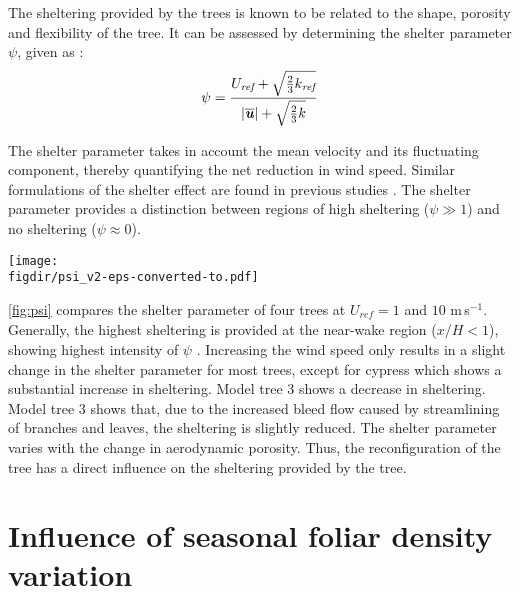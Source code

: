 The sheltering provided by the trees is known to be related to the shape, porosity and flexibility of the tree. It can be assessed by determining the shelter parameter $\psi$, given as \citep{Gandemer1979}:
\begin{equation}
\psi  = \frac{{{U_{\textit{ref}}} + \sqrt {\frac{2}{3} {k_{\textit{ref}}}} }}{{ |\overline{\textbf{\textit{u}}}| + \sqrt {\frac{2}{3} k} }}
\end{equation}

The shelter parameter takes in account the mean velocity and its fluctuating component, thereby quantifying the net reduction in wind speed. Similar formulations of the shelter effect are found in previous studies \citep{Lee2014565,Lee2012,McClure2017,Packwood2000,Perera1981,Santiago2007}. The shelter parameter provides a distinction between regions of high sheltering ($\psi \gg 1$) and no sheltering ($\psi \approx 0$).

	\begin{sidewaysfigure}[p]
	\centering
	\texttt{[image: \\figdir/psi\_v2-eps-converted-to.pdf]}
	\caption{Shelter parameter $\psi$ of  model tree 1,  model tree 3,  cypress and  holly. The comparison is done for two wind speeds:  $U_{\textit{ref}}=1$ m\,s$^{-1}$ and  $U_{\textit{ref}}=10$ m\,s$^{-1}$.}
	\label{fig:psi}
	\end{sidewaysfigure}


\cref{fig:psi} compares the shelter parameter of four trees at $U_{\textit{ref}}=1$ and $10$ m\,s$^{-1}$. Generally, the highest sheltering is provided at the near-wake region ($x/H<1$), showing highest intensity of $\psi$ . Increasing the wind speed only results in a slight change in the shelter parameter for most trees, except for cypress which shows a substantial increase in sheltering. Model tree 3 shows a decrease in sheltering. Model tree 3 shows that, due to the increased bleed flow caused by streamlining of branches and leaves, the sheltering is slightly reduced. The shelter parameter varies with the change in aerodynamic porosity. Thus, the reconfiguration of the tree has a direct influence on the sheltering provided by the tree.

\section{Influence of seasonal foliar density variation}

